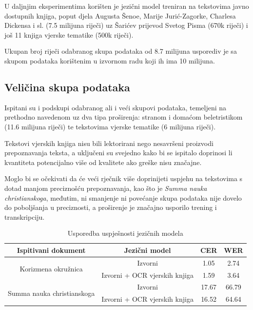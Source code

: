 \documentclass[zavrsnirad]{fer}
\begin{document}
U daljnjim eksperimentima korišten je jezični model treniran na tekstovima javno dostupnih knjiga, poput djela Augusta Šenoe, Marije Jurić-Zagorke, Charlesa Dickensa i sl. (7.5 milijuna riječi) uz Šarićev prijevod Svetog Pisma (670k riječi) i još 11 knjiga vjerske tematike (500k riječi). 

Ukupan broj riječi odabranog skupa podataka od 8.7 milijuna usporediv je sa skupom podataka korištenim u izvornom radu koji ih ima 10 milijuna.

\subsection{Veličina skupa podataka}

Ispitani su i podskupi odabranog ali i veći skupovi podataka, temeljeni na prethodno navedenom uz dva tipa proširenja: stranom i domaćom beletristikom (11.6 milijuna riječi) te tekstovima vjerske tematike (6 milijuna riječi).

Tekstovi vjerskih knjiga nisu bili lektorirani nego nesavršeni proizvodi prepoznavanja teksta, a uključeni su svejedno kako bi se ispitalo doprinosi li kvantiteta potencijalno više od kvalitete ako greške nisu značajne.

Moglo bi se očekivati da će veći rječnik više doprinijeti uspjehu na tekstovima s dotad manjom preciznošću prepoznavanja, kao što je \textit{Summa nauka christianskoga}, međutim, ni smanjenje ni povećanje skupa podataka nije dovelo do poboljšanja u preciznosti, a proširenje je značajno usporilo trening i transkripciju.

\bgroup
\def\arraystretch{1.25}
\begin{table}[h]
	\centering
	\begin{tabular}{|c|c|c|c|}
		\hline
		\textbf{Ispitivani dokument} & \textbf{Jezični model} & \textbf{CER} & \textbf{WER} \\ \hline
		\multirow{2}{*}{Korizmena okružnica} & Izvorni & 1.05 & 2.74 \\ \cline{2-4}
		 & Izvorni + OCR vjerskih knjiga & 1.59 & 3.64 \\ \hline
		\multirow{2}{*}{Summa nauka christianskoga} & Izvorni & 17.67 & 66.79 \\ \cline{2-4}
		 & Izvorni + OCR vjerskih knjiga & 16.52 & 64.64 \\ \hline
	\end{tabular}
	\caption{Usporedba uspješnosti jezičnih modela}
	\label{tab:lm_performance}
\end{table}
\egroup
\end{document}

